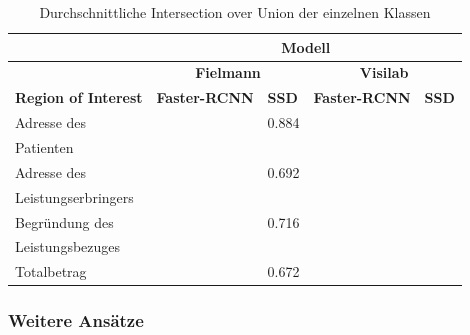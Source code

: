 
\begin{table}[h!]
\label{tab:specific-ie-iou}
\centering
    \captionsetup{width=.9\linewidth}
    \caption{Durchschnittliche Intersection over Union der einzelnen Klassen}
    \begin{tabular}{|l|l|l|l|l|}
    \hline
                                    & \multicolumn{4}{c}{\textbf{Modell}}  \\
    \hline
                                    & \multicolumn{2}{c}{\textbf{Fielmann}} & \multicolumn{2}{c}{\textbf{Visilab}} \\
    \hline
    \textbf{Region of Interest}     & \textbf{Faster-RCNN}   & \textbf{SSD}        & \textbf{Faster-RCNN}  & \textbf{SSD} \\
    \hline
    Adresse des            &                        & 0.884                & & \\
    Patienten &&&& \\
    \hline
    Adresse des  &                        & 0.692                & & \\
    Leistungserbringers &&&& \\
    \hline
    Begründung des  &                        & 0.716                & & \\
    Leistungsbezuges &&&& \\
    \hline
    Totalbetrag                     &                        & 0.672                & & \\
    \hline
    \end{tabular}
\end{table}


\subsubsection{Weitere Ansätze}

